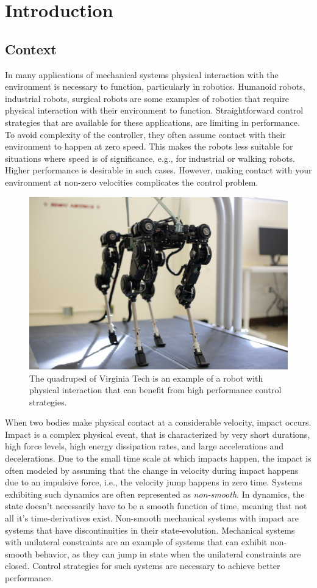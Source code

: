 \documentclass[../DC2017114Bouma.tex]{subfiles}
\begin{document}
\graphicspath{{../01_Introduction/img/}}
\renewcommand{\chaptermark}[1]{\markboth{\thechapter.\ #1}{}}
\renewcommand{\sectionmark}[1]{\markright{#1}{}}
\pagestyle{fancyreport}
\cleartooddpage
{}

\chapter{Introduction}
\section{Context}
In many applications of mechanical systems physical interaction with the environment is necessary to function, particularly in robotics. Humanoid robots, industrial robots, surgical robots are some examples of robotics that require physical interaction with their environment to function. Straightforward control strategies that are available for these applications, are limiting in performance. To avoid complexity of the controller, they often assume contact with their environment to happen at zero speed. This makes the robots less suitable for situations where speed is of significance, e.g., for industrial or walking robots. Higher performance is desirable in such cases. However, making contact with your environment at non-zero velocities complicates the control problem.

\begin{figure}[H]
\centering
\includegraphics[width=.5\textwidth]{quadruped.jpg}\caption{The quadruped of Virginia Tech is an example of a robot with physical interaction that can benefit from high performance control strategies.}\label{fig:quadrupedVT}
\end{figure}

When two bodies make physical contact at a considerable velocity, impact occurs. Impact is a complex physical event, that is characterized by very short durations, high force levels, high energy dissipation rates, and large accelerations and decelerations. Due to the small time scale at which impacts happen, the impact is often modeled by assuming that the change in velocity during impact happens due to an impulsive force, i.e., the velocity jump happens in zero time. Systems exhibiting such dynamics are often represented as \textit{non-smooth}. In dynamics, the state doesn't necessarily have to be a smooth function of time, meaning that not all it's time-derivatives exist. Non-smooth mechanical systems with impact are systems that have discontinuities in their state-evolution. Mechanical systems with unilateral constraints are an example of systems that can exhibit non-smooth behavior, as they can jump in state when the unilateral constraints are closed. Control strategies for such systems are necessary to achieve better performance. 
\end{document}
